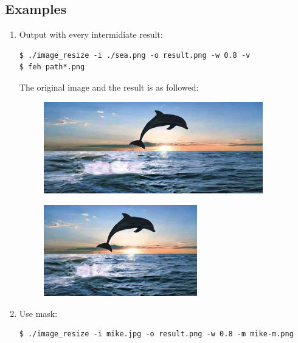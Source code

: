 \subsection{Examples}
\begin{enumerate}

  \item Output with every intermidiate result:

    \begin{lstlisting}
$ ./image_resize -i ./sea.png -o result.png -w 0.8 -v
$ feh path*.png
    \end{lstlisting}

    The original image and the result is as followed:

    \begin{figure}[H]
        \centering
        \includegraphics[width=0.9\textwidth]{src/sea.png}
    \end{figure}
    \begin{figure}[H]
        \centering
        \includegraphics[width=0.63\textwidth]{result/sea.png}
    \end{figure}

  \item Use mask:
    \begin{lstlisting}
$ ./image_resize -i mike.jpg -o result.png -w 0.8 -m mike-m.png
    \end{lstlisting}
\end{enumerate}
